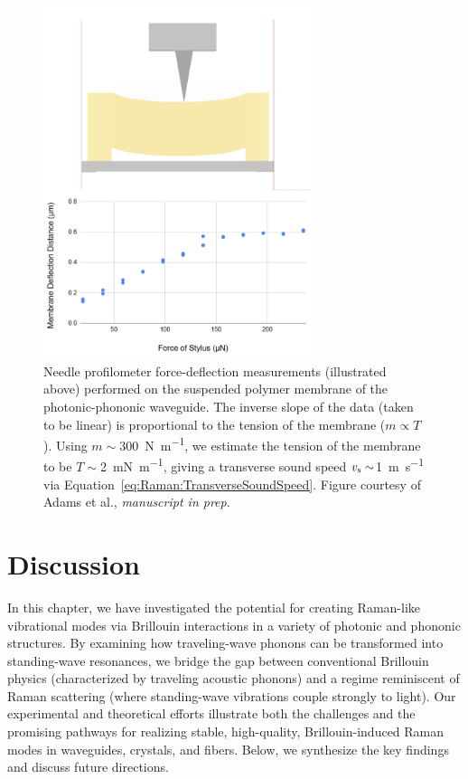 \begin{figure}[h]
  \centering
  \includegraphics[width=0.7\textwidth]{figs/4-Raman/profilometer.png}
  \caption[Needle profilometer force-deflection measurements (illustrated above) performed on the suspended polymer membrane of the photonic-phononic waveguide.]{Needle profilometer force-deflection measurements (illustrated above) performed on the suspended polymer membrane of the photonic-phononic waveguide. The inverse slope of the data (taken to be linear) is proportional to the tension of the membrane (\(m\propto T\)). Using \(m\sim\)\SI{300}{\newton\per\meter}, we estimate the tension of the membrane to be \(T\sim\)\SI{2}{\milli\newton\per\meter}, giving a transverse sound speed \(v_{\rm s}\sim\)\SI{1}{\meter\per\second} via Equation~\ref{eq:Raman:TransverseSoundSpeed}. Figure courtesy of Adams et al., \textit{manuscript in prep}.}
  \label{fig:Raman:profilometer}
\end{figure}


\section{Discussion}
\label{sec:Raman:Discussion}

In this chapter, we have investigated the potential for creating Raman-like vibrational modes via Brillouin interactions in a variety of photonic and phononic structures. By examining how traveling-wave phonons can be transformed into standing-wave resonances, we bridge the gap between conventional Brillouin physics (characterized by traveling acoustic phonons) and a regime reminiscent of Raman scattering (where standing-wave vibrations couple strongly to light). Our experimental and theoretical efforts illustrate both the challenges and the promising pathways for realizing stable, high-quality, Brillouin-induced Raman modes in waveguides, crystals, and fibers. Below, we synthesize the key findings and discuss future directions.


